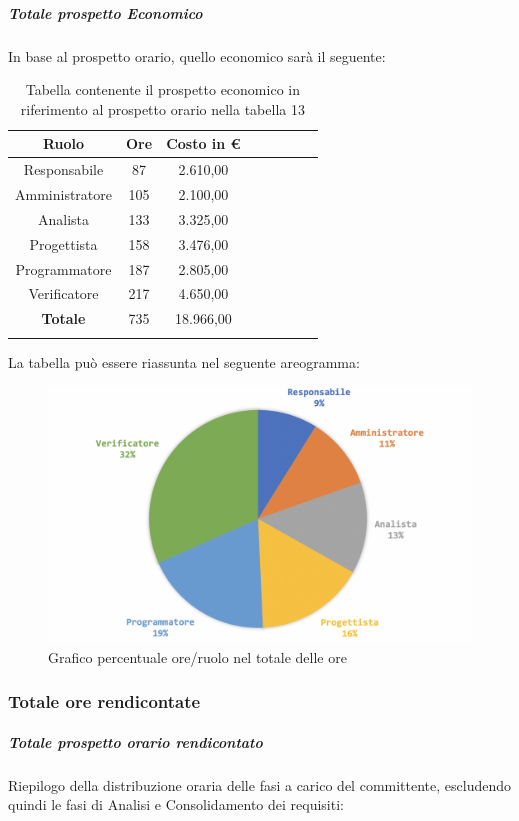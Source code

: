 			\subparagraph{Totale prospetto Economico}
			In base al prospetto orario, quello economico sarà il seguente: 
			
			\begin{longtable}{|c|c|c|c|c|c|c|c|}
				\hline
				\rowcolor{lighter-grayer}
				\textbf{Ruolo} & \textbf{Ore} & \textbf{Costo in € } \\
				\hline
				\endfirsthead
				
				\hline
				Responsabile 	    & 87 & 2.610,00\\
				\hline 
				\hline
				Amministratore	  & 105 & 2.100,00\\
				\hline
				\hline
				Analista 				& 133 & 3.325,00\\
				\hline
				\hline
				Progettista 		  & 158 & 3.476,00\\
				\hline
				\hline
				Programmatore 	 & 187 & 2.805,00\\
				\hline
				\hline
				Verificatore 		  & 217 & 4.650,00\\
				\hline
				\textbf{Totale} 	& 735 & 18.966,00\\
				\hline
				\caption{Tabella contenente il prospetto economico in riferimento al prospetto orario nella tabella 13}
			\end{longtable}
			\pagebreak
			
			La tabella può essere riassunta nel seguente areogramma:
			\begin{figure}[H]
				\centering
				\includegraphics[width=0.8\linewidth]{./images/totOre2.png}
				\caption{Grafico percentuale ore/ruolo nel totale delle ore}
				\label{fig:grafico costi ruolo fase totale ore}
			\end{figure}
		
			\subsubsection{Totale ore rendicontate}
				\subparagraph{Totale prospetto orario rendicontato}
				Riepilogo della distribuzione oraria delle fasi a carico del committente, escludendo quindi le fasi di Analisi e Consolidamento dei requisiti:
				
